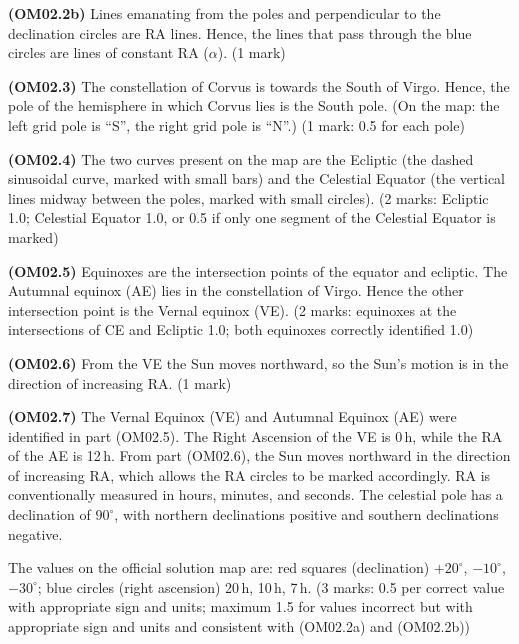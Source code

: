 \textbf{(OM02.2b)} Lines emanating from the poles and perpendicular to the
declination circles are RA lines. Hence, the lines that pass through the
blue circles are lines of constant RA ($\alpha$). \hfill(1 mark)

\textbf{(OM02.3)} The constellation of Corvus is towards the South of Virgo.
Hence, the pole of the hemisphere in which Corvus lies is the South pole.
(On the map: the left grid pole is ``S'', the right grid pole is ``N''.)
\hfill(1 mark: 0.5 for each pole)

\textbf{(OM02.4)} The two curves present on the map are the Ecliptic (the
dashed sinusoidal curve, marked with small bars) and the Celestial Equator
(the vertical lines midway between the poles, marked with small circles).
\hfill(2 marks: Ecliptic 1.0; Celestial Equator 1.0, or 0.5 if only one
segment of the Celestial Equator is marked)

\textbf{(OM02.5)} Equinoxes are the intersection points of the equator and
ecliptic. The Autumnal equinox (AE) lies in the constellation of Virgo.
Hence the other intersection point is the Vernal equinox (VE).
\hfill(2 marks: equinoxes at the intersections of CE and Ecliptic 1.0;
both equinoxes correctly identified 1.0)

\textbf{(OM02.6)} From the VE the Sun moves northward, so the Sun's motion
is in the direction of increasing RA. \hfill(1 mark)

\textbf{(OM02.7)} The Vernal Equinox (VE) and Autumnal Equinox (AE) were
identified in part (OM02.5). The Right Ascension of the VE is 0\,h, while
the RA of the AE is 12\,h. From part (OM02.6), the Sun moves northward in
the direction of increasing RA, which allows the RA circles to be marked
accordingly. RA is conventionally measured in hours, minutes, and seconds.
The celestial pole has a declination of $90^\circ$, with northern
declinations positive and southern declinations negative.

The values on the official solution map are: red squares (declination)
$+20^\circ$, $-10^\circ$, $-30^\circ$; blue circles (right ascension)
20\,h, 10\,h, 7\,h.
\hfill(3 marks: 0.5 per correct value with appropriate sign and units;
maximum 1.5 for values incorrect but with appropriate sign and units and
consistent with (OM02.2a) and (OM02.2b))

